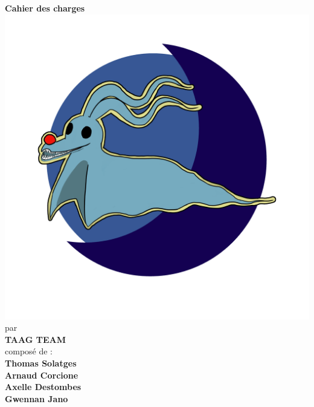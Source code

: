 \documentclass[12pt,a4paper]{article}
\begin{document}
\begin{center}
    {\huge\textbf{
        Cahier des charges
    }}
    \vspace*{\fill}
    \\
    \includegraphics[width = 15cm]{Image/final-logo.png}
     \vspace*{\fill}
    \\
    par
    \\
    \vspace{.2cm}
    {\huge\textbf{
    TAAG TEAM}}
    \\
    \vspace{1 cm}
    composé de :
    \vspace{0.2cm}
    {\textbf{
        \\
        Thomas Solatges\\
        Arnaud Corcione\\
        Axelle Destombes\\
        Gwennan Jano\\
    }}
\end{center}
\newpage
\vspace*{1mm}
\tableofcontents

\pagestyle{fancy}
\end{document}

